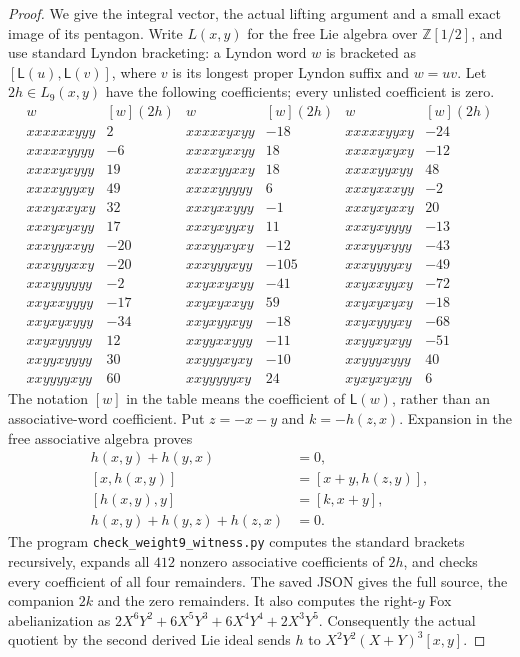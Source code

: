 \begin{proof}
We give the integral vector, the actual lifting argument and a
small exact image of its pentagon. Write $L(x,y)$ for the free
Lie algebra over $\mathbb Z[1/2]$, and use standard Lyndon
bracketing: a Lyndon word $w$ is bracketed as
$[\mathsf L(u),\mathsf L(v)]$, where $v$ is its longest proper
Lyndon suffix and $w=uv$. Let $2h\in L_9(x,y)$ have the following
coefficients; every unlisted coefficient is zero.
\[
\begin{array}{lr|lr|lr}
 w&[w](2h)&w&[w](2h)&w&[w](2h)\\ \hline
 xxxxxxyyy&2&xxxxxyxyy&-18&xxxxxyyxy&-24\\
 xxxxxyyyy&-6&xxxxyxxyy&18&xxxxyxyxy&-12\\
 xxxxyxyyy&19&xxxxyyxxy&18&xxxxyyxyy&48\\
 xxxxyyyxy&49&xxxxyyyyy&6&xxxyxxxyy&-2\\
 xxxyxxyxy&32&xxxyxxyyy&-1&xxxyxyxxy&20\\
 xxxyxyxyy&17&xxxyxyyxy&11&xxxyxyyyy&-13\\
 xxxyyxxyy&-20&xxxyyxyxy&-12&xxxyyxyyy&-43\\
 xxxyyyxxy&-20&xxxyyyxyy&-105&xxxyyyyxy&-49\\
 xxxyyyyyy&-2&xxyxxyxyy&-41&xxyxxyyxy&-72\\
 xxyxxyyyy&-17&xxyxyxxyy&59&xxyxyxyxy&-18\\
 xxyxyxyyy&-34&xxyxyyxyy&-18&xxyxyyyxy&-68\\
 xxyxyyyyy&12&xxyyxxyyy&-11&xxyyxyxyy&-51\\
 xxyyxyyyy&30&xxyyyxyxy&-10&xxyyyxyyy&40\\
 xxyyyyxyy&60&xxyyyyyxy&24&xyxyxyxyy&6
\end{array}                                               \tag{B.W1}
\]
The notation $[w]$ in the table means the coefficient of
$\mathsf L(w)$, rather than an associative-word coefficient.
Put $z=-x-y$ and $k=-h(z,x)$. Expansion in the free associative
algebra proves
\[
\begin{aligned}
 h(x,y)+h(y,x)&=0,\\
 [x,h(x,y)]&=[x+y,h(z,y)],\\
 [h(x,y),y]&=[k,x+y],\\
 h(x,y)+h(y,z)+h(z,x)&=0.
\end{aligned}                                             \tag{B.W2}
\]
The program \texttt{check\_weight9\_witness.py} computes the
standard brackets recursively, expands all $412$ nonzero
associative coefficients of $2h$, and checks every coefficient
of all four remainders. The saved JSON gives the full source,
the companion $2k$ and the zero remainders. It also computes
the right-$y$ Fox abelianization as
$2X^6Y^2+6X^5Y^3+6X^4Y^4+2X^3Y^5$.
Consequently the actual quotient by the second derived Lie ideal
sends $h$ to $X^2Y^2(X+Y)^3[x,y]$.


\end{proof}
